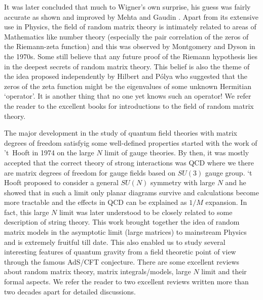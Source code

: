 \documentclass[11pt]{article}
\begin{document}
It was later concluded that much to Wigner's own surprise, 
his guess was fairly accurate as shown and improved by Mehta \cite{MEHTA1960395} and 
Gaudin \cite{GAUDIN1961447}. Apart from its extensive use in Physics, the field of random matrix theory is intimately related to areas of Mathematics like number theory 
(especially the pair correlation of the zeros of the Riemann-zeta function) and this was 
observed by Montgomery and Dyson in the 1970s. Some still believe that any future proof of the
Riemann hypothesis lies in the
deepest secrets of random matrix theory. This belief is also the theme of the idea proposed 
independently by  Hilbert and P\'{o}lya who suggested that the zeros of the zeta function 
might be the eigenvalues of some unknown Hermitian `operator'. It is another thing that 
no one yet knows such an operator! We refer the reader to the excellent books 
\cite{Meh2004, Akemann:2011csh} for introductions to the field of random matrix theory. 

The major development in the study of quantum field theories with matrix degrees of freedom satisfyig some well-defined properties started with the work of 't~Hooft in 1974 on the large $N$ limit of gauge theories. By then, it was mostly accepted that the correct theory of 
strong interactions was QCD where we there are matrix degrees of freedom for gauge fields based on $SU(3)$ gauge group. `t Hooft proposed to consider a general $SU(N)$ 
symmetry with large $N$ and he showed that in such a limit only planar diagrams survive and calculations become more tractable and the effects in QCD can be explained as $1/M$ expansion. In fact, this large $N$ limit was later 
understood to be closely related to some description of string theory. This work brought together the idea of random matrix models in the asymptotic limit (large matrices) to mainstream Physics and is extremely fruitful till date. 
This also enabled us to study several interesting features of quantum gravity 
from a field theoretic point of view through the famous AdS/CFT conjecture.
There are some excellent reviews about random matrix theory, matrix integrals/models, large $N$ limit 
and their formal aspects. We refer the reader to two excellent reviews written more than two decades 
apart \cite{DiFrancesco:1993cyw,Eynard:2015aea} for detailed discussions. \\
\end{document}
